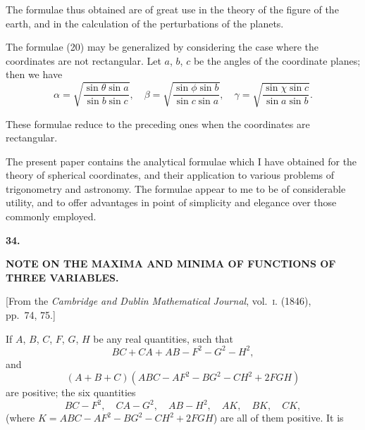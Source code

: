 \documentclass[11pt,a4paper]{book}
\begin{document}
The formulae thus obtained are of great use in the theory of the figure of the
earth, and in the calculation of the perturbations of the planets.

\newpage
\setcounter{page}{225}

The formulae (20) may be generalized by considering the case where the
coordinates are not rectangular. Let $a$, $b$, $c$ be the angles of the coordinate planes;
then we have
\[
\alpha = \sqrt{\frac{\sin\theta \sin a}{\sin b \sin c}}, \quad \beta = \sqrt{\frac{\sin\phi \sin b}{\sin c \sin a}}, \quad \gamma = \sqrt{\frac{\sin\chi \sin c}{\sin a \sin b}}.
\]

These formulae reduce to the preceding ones when the coordinates are rectangular.

\newpage
\setcounter{page}{226}

The present paper contains the analytical formulae which I have obtained for
the theory of spherical coordinates, and their application to various problems of
trigonometry and astronomy. The formulae appear to me to be of considerable utility,
and to offer advantages in point of simplicity and elegance over those commonly
employed.


\newpage
{}
\setcounter{page}{227}

\begin{center}
{\large\bfseries 34.}
\end{center}
\vspace{0.5em}
\begin{center}
{\large\bfseries NOTE ON THE MAXIMA AND MINIMA OF FUNCTIONS OF\\[0.3em]
THREE VARIABLES.}
\end{center}
\vspace{0.5em}
\begin{center}
{[From the \textit{Cambridge and Dublin Mathematical Journal}, vol.~\textsc{i}. (1846),\\
pp.~74, 75.]}
\end{center}
\vspace{1em}

If $A$, $B$, $C$, $F$, $G$, $H$ be any real quantities, such that
\[
BC + CA + AB - F^2 - G^2 - H^2,
\]
and
\[
(A+B+C)(ABC - AF^2 - BG^2 - CH^2 + 2FGH)
\]
are positive; the six quantities
\[
BC-F^2, \quad CA-G^2, \quad AB-H^2, \quad AK, \quad BK, \quad CK,
\]
(where $K = ABC - AF^2 - BG^2 - CH^2 + 2FGH$) are all of them positive. It is
\end{document}
